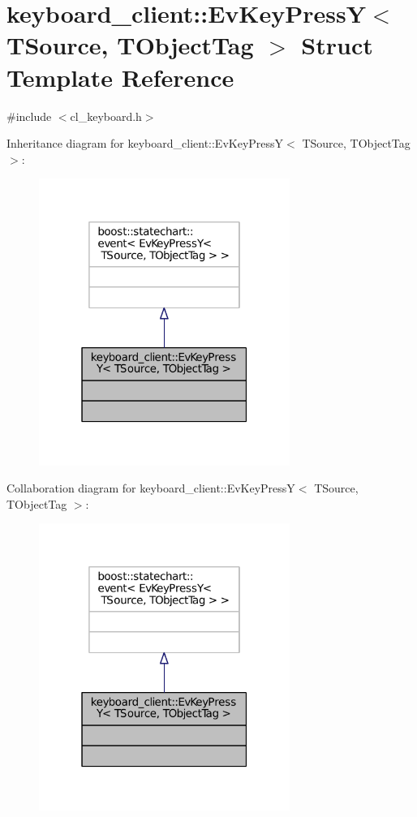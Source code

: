 \hypertarget{structkeyboard__client_1_1EvKeyPressY}{}\section{keyboard\+\_\+client\+:\+:Ev\+Key\+PressY$<$ T\+Source, T\+Object\+Tag $>$ Struct Template Reference}
\label{structkeyboard__client_1_1EvKeyPressY}


{\ttfamily \#include $<$cl\+\_\+keyboard.\+h$>$}



Inheritance diagram for keyboard\+\_\+client\+:\+:Ev\+Key\+PressY$<$ T\+Source, T\+Object\+Tag $>$\+:
\nopagebreak
\begin{figure}[H]
\begin{center}
\leavevmode
\includegraphics[width=232pt]{structkeyboard__client_1_1EvKeyPressY__inherit__graph}
\end{center}
\end{figure}


Collaboration diagram for keyboard\+\_\+client\+:\+:Ev\+Key\+PressY$<$ T\+Source, T\+Object\+Tag $>$\+:
\nopagebreak
\begin{figure}[H]
\begin{center}
\leavevmode
\includegraphics[width=232pt]{structkeyboard__client_1_1EvKeyPressY__coll__graph}
\end{center}
\end{figure}


